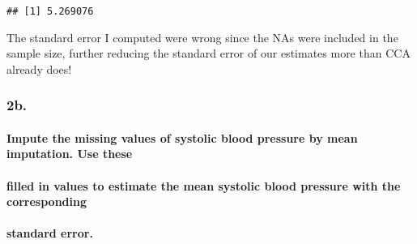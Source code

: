 \documentclass[
]{article}
\newenvironment{Shaded}{\begin{snugshade}}{\end{snugshade}}
\newcommand{\CommentTok}[1]{\textcolor[rgb]{0.56,0.35,0.01}{\textit{#1}}}
\newcommand{\KeywordTok}[1]{\textcolor[rgb]{0.13,0.29,0.53}{\textbf{#1}}}
\newcommand{\NormalTok}[1]{#1}
\newcommand{\OperatorTok}[1]{\textcolor[rgb]{0.81,0.36,0.00}{\textbf{#1}}}
\newcommand{\OtherTok}[1]{\textcolor[rgb]{0.56,0.35,0.01}{#1}}
\newcommand{\StringTok}[1]{\textcolor[rgb]{0.31,0.60,0.02}{#1}}
\begin{document}
\begin{verbatim}
## [1] 5.269076
\end{verbatim}

The standard error I computed were wrong since the NAs were included in
the sample size, further reducing the standard error of our estimates
more than CCA already does!

\hypertarget{b.}{%
\subsubsection{2b.}\label{b.}}

\hypertarget{impute-the-missing-values-of-systolic-blood-pressure-by-mean-imputation.-use-these}{%
\paragraph{Impute the missing values of systolic blood pressure by mean
imputation. Use
these}\label{impute-the-missing-values-of-systolic-blood-pressure-by-mean-imputation.-use-these}}

\hypertarget{filled-in-values-to-estimate-the-mean-systolic-blood-pressure-with-the-corresponding}{%
\paragraph{filled in values to estimate the mean systolic blood pressure
with the
corresponding}\label{filled-in-values-to-estimate-the-mean-systolic-blood-pressure-with-the-corresponding}}

\hypertarget{standard-error.}{%
\paragraph{standard error.}\label{standard-error.}}

\begin{Shaded}
\end{Shaded}
\end{document}
